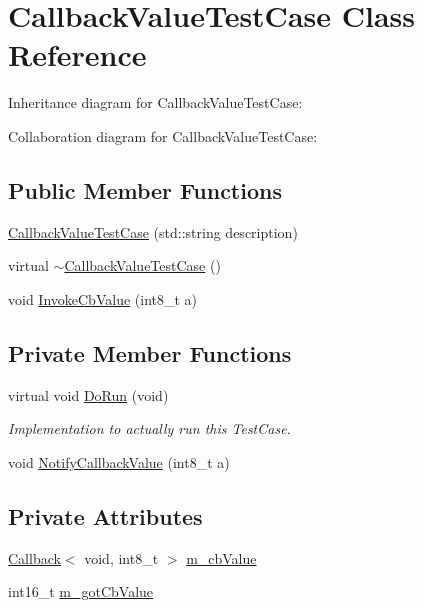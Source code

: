\hypertarget{classCallbackValueTestCase}{}\section{Callback\+Value\+Test\+Case Class Reference}
\label{classCallbackValueTestCase}


Inheritance diagram for Callback\+Value\+Test\+Case\+:


Collaboration diagram for Callback\+Value\+Test\+Case\+:
\subsection*{Public Member Functions}
\begin{DoxyCompactItemize}
\item 
\hyperlink{classCallbackValueTestCase_a128818af2f7c998a9d573f607eb42f24}{Callback\+Value\+Test\+Case} (std\+::string description)
\item 
virtual \hyperlink{classCallbackValueTestCase_ae60ffe653fb7efd6f3f94238ea10a486}{$\sim$\+Callback\+Value\+Test\+Case} ()
\item 
void \hyperlink{classCallbackValueTestCase_aa59a7c319943ea63c94dcc71895b277e}{Invoke\+Cb\+Value} (int8\+\_\+t a)
\end{DoxyCompactItemize}
\subsection*{Private Member Functions}
\begin{DoxyCompactItemize}
\item 
virtual void \hyperlink{classCallbackValueTestCase_acef10b69657dec994e6446f6b0d08291}{Do\+Run} (void)
\begin{DoxyCompactList}\small\item\em Implementation to actually run this Test\+Case. \end{DoxyCompactList}\item 
void \hyperlink{classCallbackValueTestCase_a19136cc6424c7a2f51b21481d1832902}{Notify\+Callback\+Value} (int8\+\_\+t a)
\end{DoxyCompactItemize}
\subsection*{Private Attributes}
\begin{DoxyCompactItemize}
\item 
\hyperlink{classns3_1_1Callback}{Callback}$<$ void, int8\+\_\+t $>$ \hyperlink{classCallbackValueTestCase_a3b6456f1a4e6bf019afcbe7e98782691}{m\+\_\+cb\+Value}
\item 
int16\+\_\+t \hyperlink{classCallbackValueTestCase_ae6264f15f1300b741d5ca583de995623}{m\+\_\+got\+Cb\+Value}
\end{DoxyCompactItemize}
